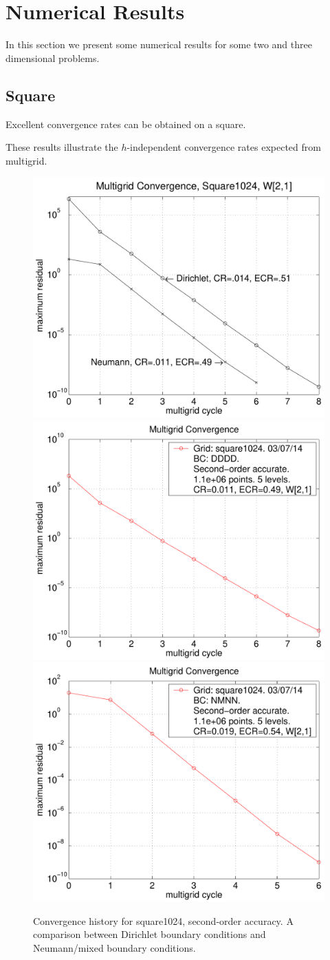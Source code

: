 \section{Numerical Results}\label{sec:numericalResults}

In this section we present some numerical results for some
two and three dimensional problems.



\subsection{Square}


 Excellent convergence rates can be obtained on a square. 

These results illustrate the $h$-independent convergence rates expected from multigrid.

\begin{figure}[hbt]
\begin{center}
  \includegraphics[width=.32\linewidth]{fig/residual_square1024_DN}
  \includegraphics[width=.32\linewidth]{fig/residual_square1024}
  \includegraphics[width=.32\linewidth]{fig/residual_square1024_mixed}
  \end{center} 
\caption{Convergence history for square1024, second-order accuracy. A comparison between Dirichlet
boundary conditions and Neumann/mixed boundary conditions.}
\label{fig:square1024}
\end{figure}


